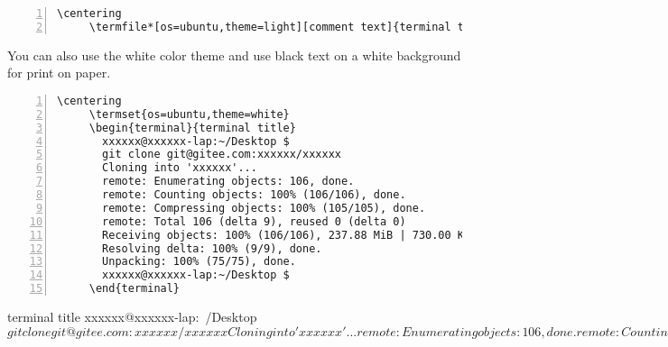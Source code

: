 \documentclass{ctxdoc}
\begin{document}
   \begin{Verbatim}[frame=none,numbers=left]
     \centering
     \termfile*[os=ubuntu,theme=light][comment text]{terminal title}{testsh}
   \end{Verbatim}

\begin{center}
\begin{minipage}{0.85\textwidth}
\end{minipage}
\end{center}

 You can also use the white color theme and
 use black text on a white background for print on paper.

   \begin{Verbatim}[frame=none,numbers=left,gobble=5]
     \centering
     \termset{os=ubuntu,theme=white}
     \begin{terminal}{terminal title}
       xxxxxx@xxxxxx-lap:~/Desktop $
       git clone git@gitee.com:xxxxxx/xxxxxx
       Cloning into 'xxxxxx'...
       remote: Enumerating objects: 106, done.
       remote: Counting objects: 100% (106/106), done.
       remote: Compressing objects: 100% (105/105), done.
       remote: Total 106 (delta 9), reused 0 (delta 0)
       Receiving objects: 100% (106/106), 237.88 MiB | 730.00 KiB/s, done.
       Resolving delta: 100% (9/9), done.
       Unpacking: 100% (75/75), done.
       xxxxxx@xxxxxx-lap:~/Desktop $
     \end{terminal}
   \end{Verbatim}

\begin{center}
\begin{minipage}{0.85\textwidth}
\begin{terminal}{terminal title}
  xxxxxx@xxxxxx-lap:~/Desktop $
  git clone git@gitee.com:xxxxxx/xxxxxx
  Cloning into 'xxxxxx'...
  remote: Enumerating objects: 106, done.
  remote: Counting objects: 100%
  remote: Compressing objects: 100%
  remote: Total 106 (delta 9), reused 0 (delta 0)
  Receiving objects: 100%
  Resolving delta: 100%
  Unpacking: 100%
  xxxxxx@xxxxxx-lap:~/Desktop $
\end{terminal}
\end{minipage}
\end{center}
\end{document}
